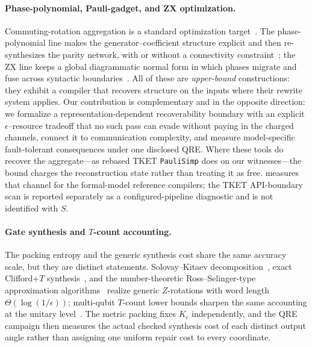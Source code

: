\documentclass[a4paper,twocolumn,10pt,unpublished]{quantumarticle}
\begin{document}
\paragraph{Phase-polynomial, Pauli-gadget, and ZX optimization.}
Commuting-rotation aggregation is a standard optimization
target~\cite{amy2014tdepth,nam2018automated,ross2016optimal,cowtan2020phase,sivarajah2021tket,duncan2020graph,kissinger2020reducing,kissinger2020pyzx}.
The phase-polynomial line makes the generator--coefficient structure
explicit and then re-synthesizes the parity network, with or without a
connectivity
constraint~\cite{amy2019cnot,beaudrap2020techniques,meijer2023architecture};
the ZX line keeps a global diagrammatic normal form in which phases
migrate and fuse across syntactic
boundaries~\cite{vandewetering2020zx,kissinger2022simulating}.  All of
these are \emph{upper-bound} constructions: they exhibit a compiler that
recovers structure on the inputs where their rewrite system applies.
Our contribution is complementary and in the opposite direction: we
formalize a representation-dependent recoverability boundary with an
explicit $\epsilon$--resource tradeoff that no such pass can evade
without paying in the charged channels, connect it to communication
complexity, and measure model-specific fault-tolerant consequences under
one disclosed QRE.  Where these tools do recover the aggregate---as
rebased TKET \texttt{PauliSimp} does on our witnesses---the bound
charges the reconstruction state rather than treating it as free.
 measures that channel for the formal-model
reference compilers; the TKET API-boundary scan is reported separately
as a configured-pipeline diagnostic and is not identified with $S$.

\paragraph{Gate synthesis and $T$-count accounting.}
The packing entropy and the generic synthesis cost share the same
accuracy scale, but they are distinct statements.
Solovay--Kitaev decomposition~\cite{dawson2006solovay}, exact Clifford+$T$
synthesis~\cite{kliuchnikov2013fast}, and the number-theoretic
Ross--Selinger-type approximation
algorithms~\cite{ross2016optimal,selinger2015efficient} realize generic
$Z$-rotations with word length $\Theta(\log(1/\epsilon))$; multi-qubit $T$-count lower
bounds sharpen the same accounting at the unitary
level~\cite{gheorghiu2022tcount}.  The metric packing fixes
$K_\epsilon$ independently, and the QRE campaign then measures the
actual checked synthesis cost of each distinct output angle rather than
assigning one uniform repair cost to every coordinate.
\end{document}

